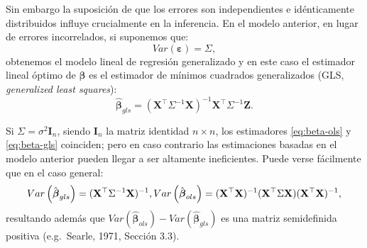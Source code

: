 \documentclass[
  spanish,
]{book}
\theoremstyle{break}
\theoremstyle{definition}
\theoremstyle{definition}
\theoremstyle{definition}
\theoremstyle{definition}
\theoremstyle{remark}
\begin{document}
Sin embargo la suposición de que los errores son independientes e idénticamente distribuidos influye crucialmente en la inferencia.
En el modelo anterior, en lugar de errores incorrelados, si suponemos que:
\[Var\left( \boldsymbol{\varepsilon} \right) =\Sigma,\]
obtenemos el modelo lineal de regresión generalizado y en este caso el estimador lineal óptimo de \(\boldsymbol{\beta}\) es el estimador de mínimos cuadrados generalizados (GLS, \emph{generalized least squares}):
\begin{equation} 
  \hat{\boldsymbol{\beta}}_{gls} =(\mathbf{X}^{\top}\Sigma^{-1} \mathbf{X})^{-1} \mathbf{X}^{\top}\Sigma^{-1} \mathbf{Z}.
  \label{eq:beta-gls}
\end{equation}

Si \(\Sigma=\sigma^{2} \mathbf{I}_{n}\), siendo \(\mathbf{I}_{n}\) la matriz identidad \(n\times n\), los estimadores \eqref{eq:beta-ols} y \eqref{eq:beta-gls} coinciden; pero en caso contrario las estimaciones basadas en el modelo anterior pueden llegar a ser altamente ineficientes.
Puede verse fácilmente que en el caso general:
\[Var\left( \hat{\boldsymbol{\beta}}_{gls} \right)=(\mathbf{X}^{\top}\Sigma^{-1} \mathbf{X})^{-1}, \\
Var\left( \hat{\boldsymbol{\beta}}_{ols} \right) =(\mathbf{X}^{\top}\mathbf{X})^{-1} (\mathbf{X}^{\top}\Sigma\mathbf{X})(\mathbf{X}^{\top}\mathbf{X})^{-1},\]
resultando además que \(Var( \hat{\boldsymbol{\beta}}_{ols}) - Var( \hat{\boldsymbol{\beta}}_{gls} )\) es una matriz semidefinida positiva (e.g.~Searle, 1971, Sección 3.3).
\end{document}
